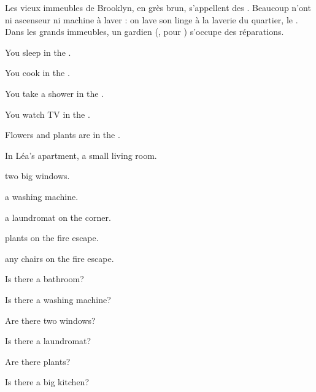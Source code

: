 \begin{culture}
Les vieux immeubles de Brooklyn, en grès brun, s'appellent des . Beaucoup n'ont ni
ascenseur ni machine à laver : on lave son linge à la laverie du quartier, le . Dans
les grands immeubles, un gardien (, pour ) s'occupe des réparations.
\end{culture}


\begin{questions}
\item You sleep in the .
\item You cook in the .
\item You take a shower in the .
\item You watch TV in the .
\item Flowers and plants are in the .
\end{questions}

\begin{questions}
\item In Léa's apartment,  a small living room.
\item {} two big windows.
\item {} a washing machine.
\item {} a laundromat on the corner.
\item {} plants on the fire escape.
\item {} any chairs on the fire escape.
\end{questions}

\begin{questions}
\item Is there a bathroom? \hfill {}
\item Is there a washing machine? \hfill {}
\item Are there two windows? \hfill {}
\item Is there a laundromat? \hfill {}
\item Are there plants? \hfill {}
\item Is there a big kitchen? \hfill {}
\end{questions}

